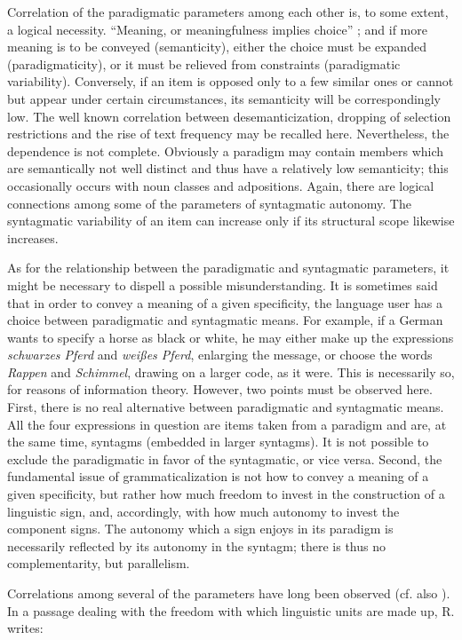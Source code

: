 Correlation of the paradigmatic parameters among each other is, to some extent, a logical necessity. “Meaning, or meaningfulness implies choice” \citep[33]{Lyons1977}; and if more meaning is to be conveyed (semanticity), either the choice must be expanded (paradigmaticity), or it must be relieved from constraints (paradigmatic variability). Conversely, if an item is opposed only to a few similar ones or cannot but appear under certain circumstances, its semanticity will be correspondingly low. The well known correlation between desemanticization, dropping of selection restrictions and the rise of text frequency may be recalled here. Nevertheless, the dependence is not complete. Obviously a paradigm may contain members which are semantically not well distinct and thus have a relatively low semanticity; this occasionally occurs with noun classes and adpositions. Again, there are logical connections among some of the parameters of syntagmatic autonomy. The syntagmatic variability of an item can increase only if its structural scope likewise increases.

As for the relationship between the paradigmatic and syntagmatic parameters, it might be necessary to dispell a possible misunderstanding. It is sometimes said that in order to convey a meaning of a given specificity, the language user has a choice between paradigmatic and syntagmatic means. For example, if a German wants to specify a horse as black or white, he may either make up the expressions \textit{schwarzes Pferd} and \textit{weißes Pferd}, enlarging the message, or choose the words \textit{Rappen} and \textit{Schimmel}, drawing on a larger code, as it were. This is necessarily so, for reasons of information theory. However, two points must be observed here. First, there is no real alternative between paradigmatic and syntagmatic means. All the four expressions in question are items taken from a paradigm and are, at the same time, syntagms (embedded in larger syntagms). It is not possible to exclude the paradigmatic in favor of the syntagmatic, or vice versa. Second, the fundamental issue of grammaticalization is not how to convey a meaning of a given specificity, but rather how much freedom to invest in the construction of a linguistic sign, and, accordingly, with how much autonomy to invest the component signs. The autonomy which a sign enjoys in its paradigm is necessarily reflected by its autonomy in the syntagm; there is thus no complementarity, but parallelism.

Correlations among several of the parameters have long been observed (cf. also \citet[62-68]{HeineEtAl1984}). In a passage dealing with the freedom with which linguistic units are made up, R. \citet{Jakobson1956} writes:

